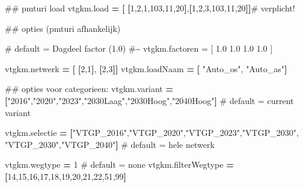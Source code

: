 \documentclass[
  letterpaper,
  DIV=11,
  numbers=noendperiod]{scrreprt}
\newenvironment{Shaded}{\begin{snugshade}}{\end{snugshade}}
\newcommand{\AttributeTok}[1]{\textcolor[rgb]{0.40,0.45,0.13}{#1}}
\newcommand{\CommentTok}[1]{\textcolor[rgb]{0.37,0.37,0.37}{#1}}
\newcommand{\DecValTok}[1]{\textcolor[rgb]{0.68,0.00,0.00}{#1}}
\newcommand{\KeywordTok}[1]{\textcolor[rgb]{0.00,0.23,0.31}{\textbf{#1}}}
\newcommand{\NormalTok}[1]{\textcolor[rgb]{0.00,0.23,0.31}{#1}}
\newcommand{\StringTok}[1]{\textcolor[rgb]{0.13,0.47,0.30}{#1}}
\begin{document}
\begin{Shaded}
\begin{Highlighting}[]

\CommentTok{\#\# pmturi load}
\NormalTok{vtgkm}\AttributeTok{.load}          \KeywordTok{=} \KeywordTok{[} \KeywordTok{[}\DecValTok{1}\NormalTok{,}\DecValTok{2}\NormalTok{,}\DecValTok{1}\NormalTok{,}\DecValTok{103}\NormalTok{,}\DecValTok{11}\NormalTok{,}\DecValTok{20}\KeywordTok{]}\NormalTok{,}\KeywordTok{[}\DecValTok{1}\NormalTok{,}\DecValTok{2}\NormalTok{,}\DecValTok{3}\NormalTok{,}\DecValTok{103}\NormalTok{,}\DecValTok{11}\NormalTok{,}\DecValTok{20}\KeywordTok{]]}\CommentTok{\# verplicht!}

\CommentTok{\#\# opties (pmturi afhankelijk)}

\CommentTok{\# default = Dagdeel factor (1.0)}
\CommentTok{\#\textasciitilde{} vtgkm.factoren      = [ 1.0                    1.0    1.0    1.0        ]  }

\NormalTok{vtgkm}\AttributeTok{.netwerk}       \KeywordTok{=} \KeywordTok{[} \KeywordTok{[}\DecValTok{2}\NormalTok{,}\DecValTok{1}\KeywordTok{]}\NormalTok{,                }\KeywordTok{[}\DecValTok{2}\NormalTok{,}\DecValTok{3}\KeywordTok{]]} 
\NormalTok{vtgkm}\AttributeTok{.loadNaam}      \KeywordTok{=} \KeywordTok{[} \StringTok{"Auto\_os"}\NormalTok{,            }\StringTok{"Auto\_as"}\KeywordTok{]} 

\CommentTok{\#\# opties voor categorieen:}
\NormalTok{vtgkm}\AttributeTok{.variant} \KeywordTok{=} \KeywordTok{[}\StringTok{"2016"}\NormalTok{,}\StringTok{"2020"}\NormalTok{,}\StringTok{"2023"}\NormalTok{,}\StringTok{"2030Laag"}\NormalTok{,}\StringTok{"2030Hoog"}\NormalTok{,}\StringTok{"2040Hoog"}\KeywordTok{]} 
\CommentTok{\# default = current variant}

\NormalTok{vtgkm}\AttributeTok{.selectie} \KeywordTok{=} \KeywordTok{[}\StringTok{"VTGP\_2016"}\NormalTok{,}\StringTok{"VTGP\_2020"}\NormalTok{,}\StringTok{"VTGP\_2023"}\NormalTok{,}\StringTok{"VTGP\_2030"}\NormalTok{,}
\StringTok{"VTGP\_2030"}\NormalTok{,}\StringTok{"VTGP\_2040"}\KeywordTok{]}    
\CommentTok{\# default = hele netwerk}


\NormalTok{vtgkm}\AttributeTok{.wegtype} \KeywordTok{=} \DecValTok{1}        \CommentTok{\# default = none}
\NormalTok{vtgkm}\AttributeTok{.filterWegtype} \KeywordTok{=} \KeywordTok{[}\DecValTok{14}\NormalTok{,}\DecValTok{15}\NormalTok{,}\DecValTok{16}\NormalTok{,}\DecValTok{17}\NormalTok{,}\DecValTok{18}\NormalTok{,}\DecValTok{19}\NormalTok{,}\DecValTok{20}\NormalTok{,}\DecValTok{21}\NormalTok{,}\DecValTok{22}\NormalTok{,}\DecValTok{51}\NormalTok{,}\DecValTok{99}\KeywordTok{]}    
\end{Highlighting}
\end{Shaded}
\end{document}
